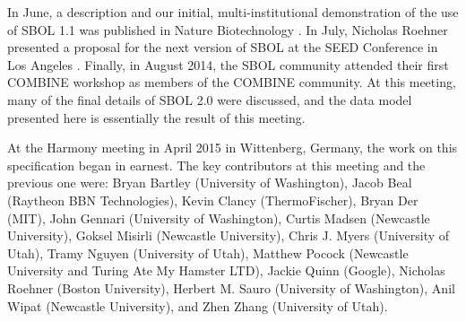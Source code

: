 In June, a description and our initial, multi-institutional demonstration of the use of SBOL 1.1 was published in Nature Biotechnology \cite{galdzicki2014synthetic}. In July, Nicholas Roehner presented a proposal for the next version of SBOL at the SEED Conference in Los Angeles \cite{roehner2014proposed}.  Finally, in August 2014, the SBOL community attended their first COMBINE workshop as members of the COMBINE community.  At this meeting, many of the final details of SBOL 2.0 were discussed, and the data model presented here is essentially the result of this meeting.

At the Harmony meeting in April 2015 in Wittenberg, Germany, the work on this specification began in earnest.  The key contributors at this meeting and the previous one were: Bryan Bartley (University of Washington), Jacob Beal (Raytheon BBN Technologies), Kevin Clancy (ThermoFischer), Bryan Der (MIT), John Gennari (University of Washington), Curtis Madsen (Newcastle University), Goksel Misirli (Newcastle University), Chris J. Myers (University of Utah), Tramy Nguyen (University of Utah), Matthew Pocock (Newcastle University and Turing Ate My Hamster LTD), Jackie Quinn (Google), Nicholas Roehner (Boston University), Herbert M. Sauro (University of Washington), Anil Wipat (Newcastle University), and Zhen Zhang (University of Utah).

